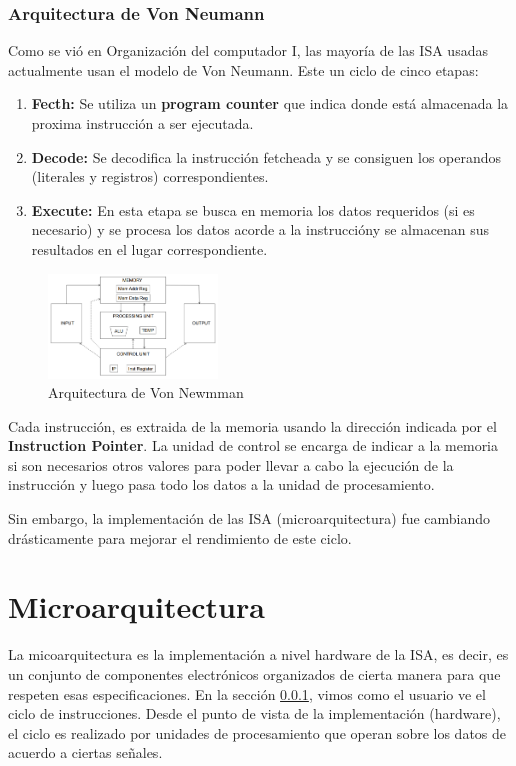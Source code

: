 \subsubsection{Arquitectura de Von Neumann}\label{Intro::ISA::Von_Neuman}
Como se vió en Organización del computador I, las mayoría de las ISA usadas actualmente usan el modelo de Von Neumann. Este un ciclo de cinco etapas: 

\begin{enumerate}
	\item \textbf{Fecth:} Se utiliza un \textbf{program counter} que indica donde está almacenada la proxima instrucción a ser ejecutada.
	\item \textbf{Decode:} Se decodifica la instrucción fetcheada y se consiguen los operandos (literales y registros) correspondientes.
	\item \textbf{Execute:} En esta etapa se busca en memoria los datos requeridos (si es necesario) y se procesa los datos acorde a la instruccióny se almacenan sus resultados en el lugar correspondiente.
\end{enumerate}

\begin{figure}[h]
	\centering
	\includegraphics[width=0.4\textwidth]{imagenes/von_neuman_arquichtecture}
	\caption{Arquitectura de Von Newmman}
	\label{fig:vonneumanarquichtecture}
\end{figure}
Cada instrucción, es extraida de la memoria usando la dirección indicada por el \textbf{Instruction Pointer}. La unidad de control se encarga de indicar a la memoria si son necesarios otros valores para poder llevar a cabo la ejecución de la instrucción y luego pasa todo los datos a la unidad de procesamiento.

Sin embargo, la implementación de las ISA (microarquitectura) fue cambiando drásticamente para mejorar el rendimiento de este ciclo.

\section{Microarquitectura}
La micoarquitectura es la implementación a nivel hardware de la ISA, es decir, es un conjunto de componentes electrónicos organizados de cierta manera para que respeten esas especificaciones. En la sección \ref{Intro::ISA::Von_Neuman}, vimos como el usuario ve el ciclo de instrucciones. Desde el punto de vista de la implementación (hardware), el ciclo es realizado por unidades de procesamiento que operan sobre los datos de acuerdo a ciertas señales. 

